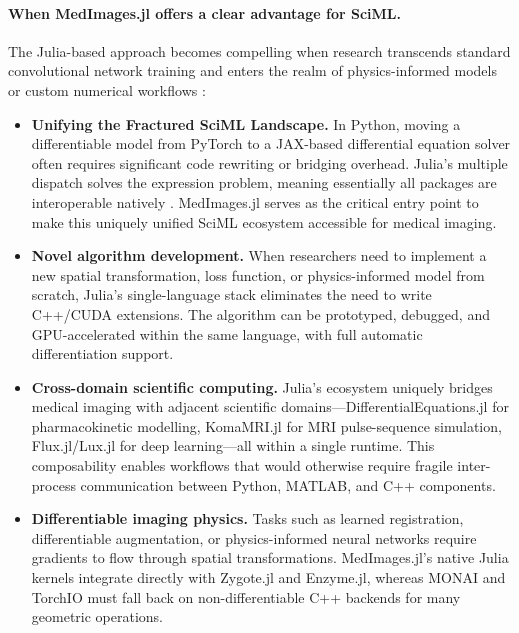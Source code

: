 \documentclass[10pt,letterpaper]{article}
\begin{document}
\paragraph{When MedImages.jl offers a clear advantage for SciML.}
The Julia-based approach becomes compelling when research transcends standard convolutional network training and enters the realm of physics-informed models or custom numerical workflows \cite{RoeschGreener2023}:
\begin{itemize}
    \item \textbf{Unifying the Fractured SciML Landscape.} In Python, moving a differentiable model from PyTorch to a JAX-based differential equation solver often requires significant code rewriting or bridging overhead. Julia's multiple dispatch solves the expression problem, meaning essentially all packages are interoperable natively \cite{PalBhattacharya2024, EschleGl2023}. MedImages.jl serves as the critical entry point to make this uniquely unified SciML ecosystem accessible for medical imaging.
    \item \textbf{Novel algorithm development.} When researchers need to implement a new spatial transformation, loss function, or physics-informed model from scratch, Julia's single-language stack eliminates the need to write C++/CUDA extensions. The algorithm can be prototyped, debugged, and GPU-accelerated within the same language, with full automatic differentiation support.
    \item \textbf{Cross-domain scientific computing.} Julia's ecosystem uniquely bridges medical imaging with adjacent scientific domains---DifferentialEquations.jl for pharmacokinetic modelling, KomaMRI.jl \cite{CastilloPassiCoronado2023} for MRI pulse-sequence simulation, Flux.jl/Lux.jl \cite{pal2023lux} for deep learning---all within a single runtime. This composability enables workflows that would otherwise require fragile inter-process communication between Python, MATLAB, and C++ components.
    \item \textbf{Differentiable imaging physics.} Tasks such as learned registration, differentiable augmentation, or physics-informed neural networks require gradients to flow through spatial transformations. MedImages.jl's native Julia kernels integrate directly with Zygote.jl and Enzyme.jl, whereas MONAI and TorchIO must fall back on non-differentiable C++ backends for many geometric operations.
\end{itemize}
\end{document}
